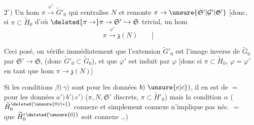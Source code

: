 \(2^\circ)\) Un hom \(\pi\xrightarrow{\varphi'}\widetilde G'_0\) qui centralise \(N\) et remonte \(\pi\to\unsure{\mathfrak{S}'|\mathcal{G}'|\mathfrak{G}'}\) [donc, si \(\pi\subset\widetilde H_0\) d'où \(\deleted{\pi\to}\pi\to\mathfrak{S}'\lhook\joinrel\to\mathfrak{S}\) trivial, un hom
\[
 \pi\xrightarrow{\varphi'}\mathfrak{z}(N)\qquad ]
\]

Ceci posé, on vérifie immédiatement que l'extension \(\widetilde G'_0\) est l'image inverse de \(\widetilde G_0\) par \(\mathfrak{S}'\to\mathfrak{S}\),  (donc \(\widetilde G'_0\subset\widetilde G_0\)), et que \(\varphi'\) est induit par \(\varphi\) [donc si \(\pi\subset\widetilde H_0\), \(\varphi=\varphi'\) en tant que hom \(\pi\to\mathfrak{z}(N)\)]

Si les conditions \deleted{\unsure{\(\alpha)\)}} \(\beta)\ \gamma)\) sont  pour les données  \(b)\ \unsure{e|c})\), il en est de \(=\) pour les données  \(a')\,b')\,e')\) (\(\pi,N,\mathfrak{S}'\) discrets, \(\pi\subset\widetilde H'_0\)) mais la condition \(\alpha\) (\(\widetilde H_0^{\deleted{\unsure{0|\prime|\ast}}}\) connexe et simplement connexe n'implique pas néc. \(=\) que \(\widetilde H'_0{}^{\deleted{\unsure{0}}}\) soit connexe \ldots)


